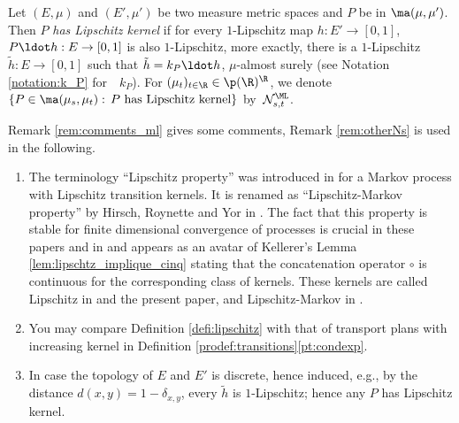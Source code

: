 \begin{defi}[{\cite[Def.\,3]{Ke72}}]\label{defi:lipschitz} Let $(E,\mu)$ and $(E',\mu')$ be two measure metric spaces and $P$ be in $\ma(\mu,\mu')$. Then $P$ \emph{has Lipschitz kernel} if for every $1$-Lipschitz map $h:E'\to [0,1]$, $P\ldot h:E\to [0,1]$ is also $1$-Lipschitz, \ie more exactly, there is a $1$-Lipschitz $\tilde h:E\to [0,1]$ such that $\tilde h=k_P\ldot h$, $\mu$-almost surely (see Notation \ref{notation:k_P} for~ $k_P$). For $(\mu_t)_{t\in\R}\in\p(\R)^\R$, we denote $\{P\in\ma(\mu_s,\mu_t):\,P\ \text{has Lipschitz kernel}\}$ by~$\mathcal{N}^\ML_{s,t}$.
\end{defi}

Remark \ref{rem:comments_ml} gives some comments, Remark \ref{rem:otherNs} is used in the following.

\skpt
\begin{rem}\label{rem:comments_ml}
\begin{enumerate}
\item
The terminology ``Lipschitz property'' was introduced in \cite[Def.\,4.1]{Low} for a Markov process with Lipschitz transition kernels. It is renamed as ``Lipschitz-Markov property'' by Hirsch, Roynette and Yor in \cite{HiRoYo14}. The fact that this property is stable for finite dimensional convergence of processes is crucial in these papers and in \cite{Low2} and appears as an avatar of Kellerer's Lemma \ref{lem:lipschtz_implique_cinq} stating that the concatenation operator $\circ$ is continuous for the corresponding class of kernels. These kernels are called Lipschitz in \cite{Ju_seminaire,BeJu16} and the present paper, and Lipschitz-Markov in \cite{BHS}.

\item
You may compare Definition \ref{defi:lipschitz} with that of transport plans with increasing kernel in Definition \ref{prodef:transitions}\eqref{pt:condexp}.

\item
\cite[p.\,115]{Ke72} In case the topology of $E$ and $E'$ is discrete, hence induced, e.g., by the distance $d(x,y)=1-\delta_{x,y}$, every $\tilde h$ is $1$-Lipschitz; hence any $P$ has Lipschitz kernel.
\end{enumerate}
\end{rem}

